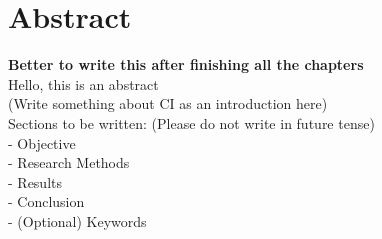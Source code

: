 \chapter*{Abstract}
\textbf{Better to write this after finishing all the chapters}\\
Hello, this is an abstract \\
(Write something about CI as an introduction here)\\
Sections to be written: (Please do not write in future tense)\\
- Objective\\
- Research Methods\\
- Results\\
- Conclusion\\
- (Optional) Keywords